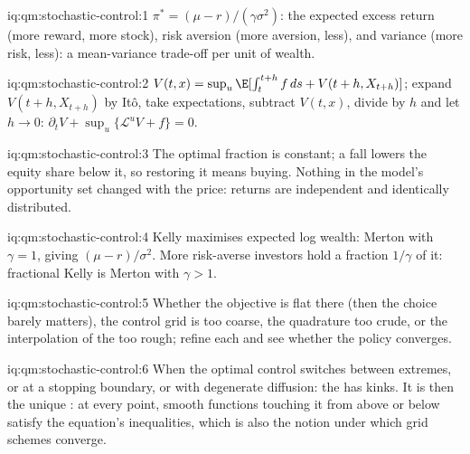 \begin{solution}{iq:qm:stochastic-control:1}
$\pi^* = (\mu - r)/(\gamma\sigma^2)$: the expected excess return (more reward, more stock), risk aversion (more aversion,
less), and variance (more risk, less): a mean-variance trade-off per unit of wealth.
\end{solution}

\begin{solution}{iq:qm:stochastic-control:2}
$V(t, x) = \sup_u\E[\int_t^{t+h}f\,ds + V(t + h, X_{t+h})]$; expand $V(t + h, X_{t+h})$ by Itô, take expectations, subtract $V(t,
x)$, divide by $h$ and let $h \to 0$: $\partial_tV + \sup_u\{\mathcal L^uV + f\} = 0$.
\end{solution}

\begin{solution}{iq:qm:stochastic-control:3}
The optimal fraction is constant; a fall lowers the equity share below it, so restoring it means buying. Nothing
in the model's opportunity set changed with the price: returns are independent and identically distributed.
\end{solution}

\begin{solution}{iq:qm:stochastic-control:4}
Kelly maximises expected log wealth: Merton with $\gamma = 1$, giving $(\mu - r)/\sigma^2$. More risk-averse investors hold a
fraction $1/\gamma$ of it: fractional Kelly is Merton with $\gamma > 1$.
\end{solution}

\begin{solution}{iq:qm:stochastic-control:5}
Whether the objective is flat there (then the choice barely matters), the control grid is too coarse, the
quadrature too crude, or the interpolation of the  too rough; refine each and see whether the policy
converges.
\end{solution}

\begin{solution}{iq:qm:stochastic-control:6}
When the optimal control switches between extremes, or at a stopping boundary, or with degenerate diffusion: the
 has kinks. It is then the unique : at every point, smooth functions touching it
from above or below satisfy the equation's inequalities, which is also the notion under which grid schemes converge.
\end{solution}
